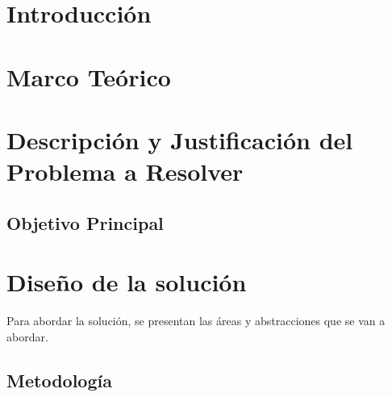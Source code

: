 \documentclass{article}
\begin{document}
\tableofcontents %

\newpage %



\section{Introducción}\label{sec:intr}



\section{Marco Teórico}\label{sec:marc}

\section{Descripción y Justificación del Problema a Resolver}\label{sec:descr}


\subsection{Objetivo Principal}


\section{Diseño de la solución}\label{sec:dis}

Para abordar la solución, se presentan las áreas y abstracciones que se van a abordar.

\subsection{Metodología}
\end{document}

